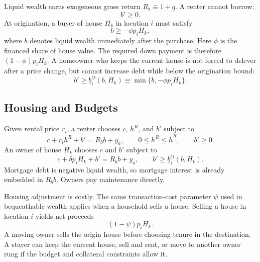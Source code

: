 \documentclass[11pt]{article}
\begin{document}
Liquid wealth earns exogeneous gross return $R_b\equiv 1+q$. A renter cannot borrow:
\begin{equation*}
    b'\geq 0.
\end{equation*}
At origination, a buyer of house $H_k$ in location $i$ must satisfy
\begin{equation}
    b\geq -\phi p_iH_k,
    \label{eq:collateral}
\end{equation}
where $b$ denotes liquid wealth immediately after the purchase. Here $\phi$ is the financed share of house value. The required down payment is therefore $(1-\phi)p_iH_k$. A homeowner who keeps the current house is not forced to delever after a price change, but cannot increase debt while below the origination bound:
\begin{equation*}
    b'\geq \underline b_i^O(b,H_k)
    \equiv
    \min\{b,-\phi p_iH_k\}.
\end{equation*}

\subsection{Housing and Budgets}

Given rental price $r_i$, a renter chooses $c$, $h^R$, and $b'$ subject to
\begin{equation*}
    c+r_i h^R+b'=R_b b+y_a,
    \qquad
    0\leq h^R\leq \bar h^R,
    \qquad
    b'\geq 0.
\end{equation*}
An owner of house $H_k$ chooses $c$ and $b'$ subject to
\begin{equation*}
    c+\delta p_iH_k+b'=R_b b+y_a,
    \qquad
    b'\geq \underline b_i^O(b,H_k).
\end{equation*}
Mortgage debt is negative liquid wealth, so mortgage interest is already embedded in $R_b b$. Owners pay maintenance directly.

Housing adjustment is costly. The same transaction-cost parameter $\psi$ used in bequeathable wealth applies when a household sells a house. Selling a house in location $i$ yields net proceeds
\begin{equation*}
    (1-\psi)p_iH_k.
\end{equation*}
A moving owner sells the origin house before choosing tenure in the destination. A stayer can keep the current house, sell and rent, or move to another owner rung if the budget and collateral constraints allow it.
\end{document}
